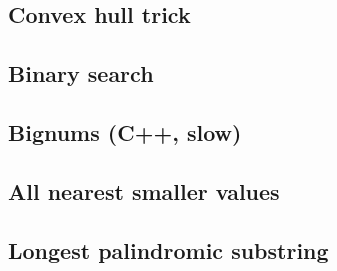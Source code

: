 \documentclass[10pt]{extarticle}
\begin{document}
\begin{multicols*}{3}
\subsection{Convex hull trick} %


\subsection{Binary search} %


\subsection{Bignums (C++, slow)} %


\subsection{All nearest smaller values} %


\subsection{Longest palindromic substring} %

\end{multicols*}
\end{document}
